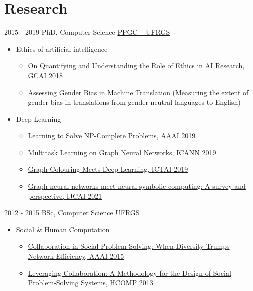 \documentclass[letterpaper]{twentysecondcv} %
\begin{document}
\section{Research}
\begin{twenty}
	\twentyitem
    	{2015 - 2019}
        {PhD, Computer Science}
        {\href{http://www.inf.ufrgs.br/ppgc/en}{PPGC -- UFRGS}}
        {}
        {
        {
        \begin{itemize}
            \item Ethics of artificial intelligence
            \begin{itemize}
                \item {\small {\color{pblue} \href{http://www.easychair.org/publications/paper/Z7D4}{On Quantifying and Understanding the Role of Ethics in AI Research, GCAI 2018}}}
                \item {\small {\color{pblue} \href{http://arxiv.org/abs/1809.02208}{Assessing Gender Bias in Machine Translation}} (Measuring the extent of gender bias in translations from gender neutral languages to English)}
            \end{itemize}
            \item Deep Learning
            \begin{itemize}
                \item {\small {\color{pblue} \href{http://arxiv.org/abs/1809.02721}{Learning to Solve NP-Complete Problems, AAAI 2019}}}
                \item {\small {\color{pblue} \href{http://arxiv.org/abs/1809.07695}{Multitask Learning on Graph Neural Networks, ICANN 2019}}}
                \item {\small {\color{pblue} \href{https://arxiv.org/pdf/1903.04598.pdf}{Graph Colouring Meets Deep Learning, ICTAI 2019}}}
                \item {\small {\color{pblue} \href{https://arxiv.org/pdf/1903.04598.pdf}{Graph neural networks meet neural-symbolic computing: A survey and perspective, IJCAI 2021}}}
            \end{itemize}
        \end{itemize}
        }
        }
    \twentyitem
    	{2012 - 2015}
        {BSc, Computer Science}
        {\href{http://www.ufrgs.br}{UFRGS}}
        {}
        {
        {
        \begin{itemize}
            \item Social \& Human Computation
            \begin{itemize}
                \item {\small \color{pblue} \href{http://www.aaai.org/ocs/index.php/AAAI/AAAI15/paper/view/9844}{Collaboration in Social Problem-Solving: When Diversity Trumps Network Efficiency, AAAI 2015}}
                \item {\small \color{pblue} \href{http://www.aaai.org/ocs/index.php/HCOMP/HCOMP13/paper/view/7481}{Leveraging Collaboration: A Methodology for the Design of Social Problem-Solving Systems, HCOMP 2013}}
            \end{itemize}
        \end{itemize}
        }
        }
\end{twenty}
\end{document}
